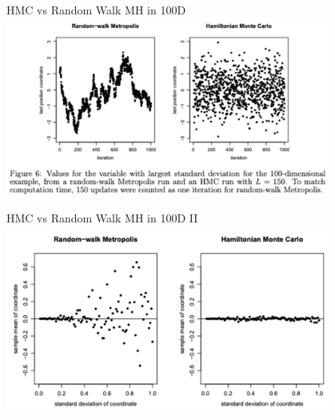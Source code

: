 \documentclass[aspectratio=169]{beamer}
\begin{document}
\begin{frame}{HMC vs Random Walk MH in 100D}
\centering
\includegraphics[width=0.8\textwidth]{figures/lap3/hmc_100d.pdf}
\end{frame}

\begin{frame}{HMC vs Random Walk MH in 100D II}
\centering
\includegraphics[width=0.8\textwidth]{figures/lap3/hmc_100d_mean.pdf}
\end{frame}
\end{document}

